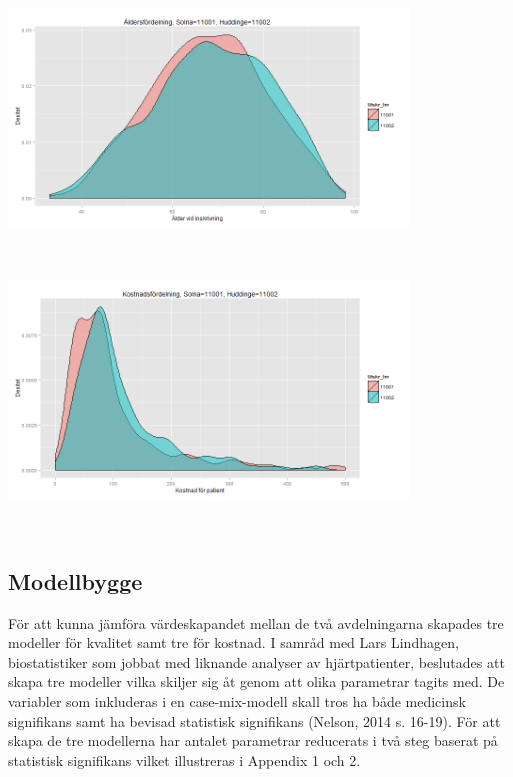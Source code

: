 \noindent\begin{minipage}{\textwidth}
\centering
\includegraphics[width=0.8\textwidth]{alder.png}
\label{fig:alder}            
\end{minipage}
\\

\noindent\begin{minipage}{\textwidth}
\centering
\includegraphics[width=0.8\textwidth]{kostnad.png}
\label{fig:kostnad}            
\end{minipage}
\\

\subsection{Modellbygge}

För att kunna jämföra värdeskapandet mellan de två avdelningarna skapades tre modeller för kvalitet samt tre för kostnad. I samråd med Lars Lindhagen, biostatistiker som jobbat med liknande analyser av hjärtpatienter, beslutades att skapa tre modeller vilka skiljer sig åt genom att olika parametrar tagits med. De variabler som inkluderas i en case-mix-modell skall tros ha både medicinsk signifikans samt ha bevisad statistisk signifikans (Nelson, 2014 s. 16-19). För att skapa de tre modellerna har antalet parametrar reducerats i två steg baserat på statistisk signifikans vilket illustreras i Appendix 1 och 2.

